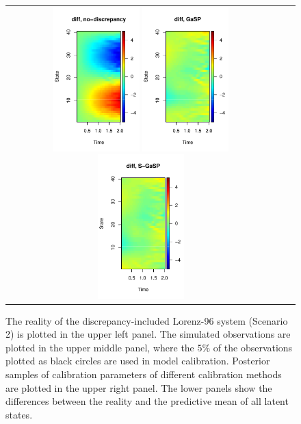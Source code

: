 \begin{figure}[t]
\begin{tabular}{ccc}
	\hspace{-.1in} \includegraphics[height=0.5\textwidth,width=0.33\textwidth]{figures/no_discrepancy_Lorenz_96_with_discrepancy.pdf}
	\hspace{-.1in} \includegraphics[height=0.5\textwidth,width=0.33\textwidth]{figures/gasp_Lorenz_96_with_discrepancy.pdf}
		\hspace{-.1in} \includegraphics[height=0.5\textwidth,width=0.33\textwidth]{figures/sgasp_discrepancy_Lorenz_96_with_discrepancy.pdf} \vspace{-.15in}

\end{tabular}
   \caption{The reality of the discrepancy-included Lorenz-96 system (Scenario 2) is plotted in the upper left panel. The simulated observations are plotted in the upper middle panel, where the $5\%$ of the observations plotted as black circles are used in model calibration.  Posterior samples of calibration parameters of different calibration methods are plotted in the upper right panel.  The lower panels show the differences between the reality and the predictive mean  of all latent states.   }
 \label{fig:lorenz_96_discrepancy}
\end{figure}


